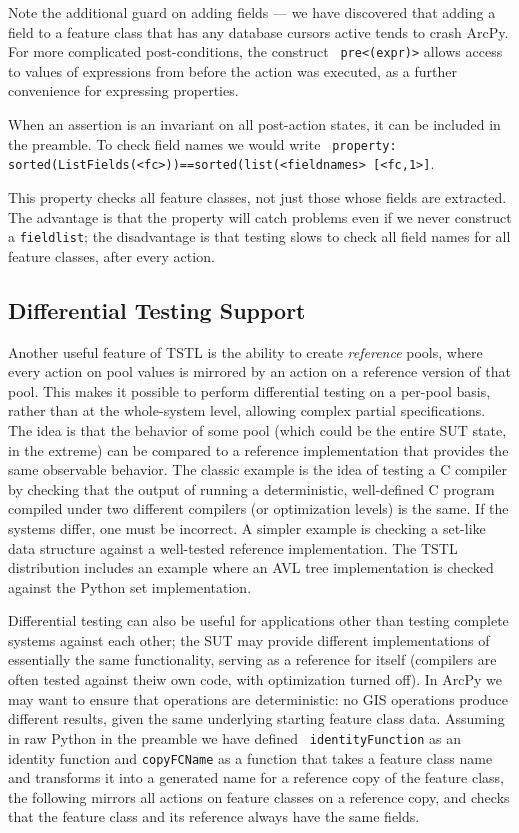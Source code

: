 Note the additional guard on adding fields --- we have discovered that
adding a field to a feature class that has any database cursors active
tends to crash ArcPy.  For more complicated post-conditions, the construct {\tt
  pre<(expr)>} allows access to values of expressions from before the
action was executed, as a further convenience for expressing properties.

When an assertion is an invariant on all post-action states, it can be
included in the preamble.  To check field names we would write {\tt
  property: sorted(ListFields(<fc>))==sorted(list(<fieldnames>
  [<fc,1>]}.

This property checks all feature classes, not just those whose
fields are extracted.  The advantage is that the property will
catch problems even if we never construct a {\tt fieldlist}; the
disadvantage is that testing slows to check all field names for all
feature classes, after every action.

\subsection{Differential Testing Support}
\label{sec:differential}

Another useful feature of TSTL is the ability to create
\emph{reference} pools, where every action on pool values is mirrored
by an action on a reference version of that pool.  This makes it
possible to perform differential testing \cite{Differential} on a
per-pool basis, rather than at the whole-system level, allowing
complex partial specifications.  The idea is that the behavior of some
pool (which could be the entire SUT state, in the extreme) can be
compared to a reference implementation that provides the same
observable behavior.  The classic example is the idea of testing a C
compiler by checking that the output of running a deterministic, well-defined
C program compiled under two different compilers (or optimization
levels) is the same.  If the systems differ, one must be incorrect.  A
simpler example is checking a set-like data structure against a
well-tested reference implementation.  The TSTL distribution includes
an example where an AVL tree implementation is checked against the
Python set implementation.

Differential testing can also be useful for applications other than
testing complete systems against each other; the SUT may provide
different implementations of essentially the same functionality,
serving as a reference for itself (compilers are often tested against
theiw own code, with optimization turned off). In ArcPy we may want to
ensure that operations are deterministic: no GIS operations produce
different results, given the same underlying starting feature class
data.  Assuming in raw Python in the preamble we have defined {\tt
  identityFunction} as an identity function and {\tt copyFCName} as a
function that takes a feature class name and transforms it into a
generated name for a reference copy of the feature class, the
following mirrors all actions on feature classes on a reference copy,
and checks that the feature class and its reference always have the
same fields.

